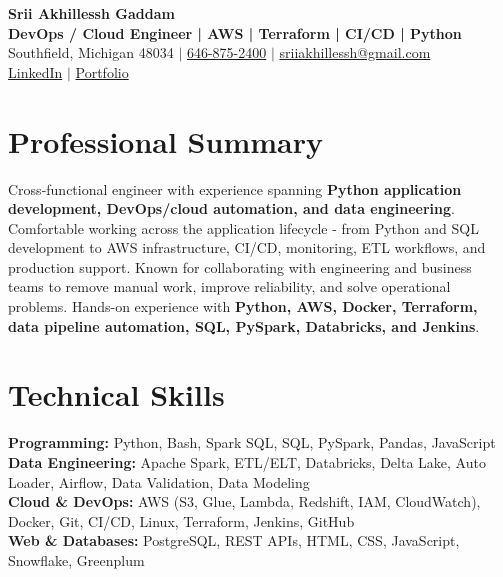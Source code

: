 \documentclass[letterpaper,10pt]{article}
\begin{document}
\fontsize{9.35pt}{10.45pt}\selectfont

\begin{center}
    {\LARGE \textbf{Srii Akhillessh Gaddam}} \\[-1pt]
    \textbf{DevOps / Cloud Engineer | AWS | Terraform | CI/CD | Python} \\[2pt]
    Southfield, Michigan 48034 $|$
    \href{tel:6468752400}{646-875-2400} $|$
    \href{mailto:sriiakhillessh@gmail.com}{sriiakhillessh@gmail.com} \\[1pt]
    \href{https://www.linkedin.com/in/srii-akhiilessh-gaddam-b48668191/}{LinkedIn} $|$
    \href{https://sriiakhillesshg.github.io/portfolio/}{Portfolio}
\end{center}
\vspace{-8pt}

\section{Professional Summary}
\small{Cross-functional engineer with experience spanning \textbf{Python application development, DevOps/cloud automation, and data engineering}. Comfortable working across the application lifecycle - from Python and SQL development to AWS infrastructure, CI/CD, monitoring, ETL workflows, and production support. Known for collaborating with engineering and business teams to remove manual work, improve reliability, and solve operational problems. Hands-on experience with \textbf{Python, AWS, Docker, Terraform, data pipeline automation, SQL, PySpark, Databricks, and Jenkins}.}

\section{Technical Skills}
\small{
\textbf{Programming:} Python, Bash, Spark SQL, SQL, PySpark, Pandas, JavaScript \\
\textbf{Data Engineering:} Apache Spark, ETL/ELT, Databricks, Delta Lake, Auto Loader, Airflow, Data Validation, Data Modeling \\
\textbf{Cloud \& DevOps:} AWS (S3, Glue, Lambda, Redshift, IAM, CloudWatch), Docker, Git, CI/CD, Linux, Terraform, Jenkins, GitHub \\
\textbf{Web \& Databases:} PostgreSQL, REST APIs, HTML, CSS, JavaScript, Snowflake, Greenplum
}
\end{document}
